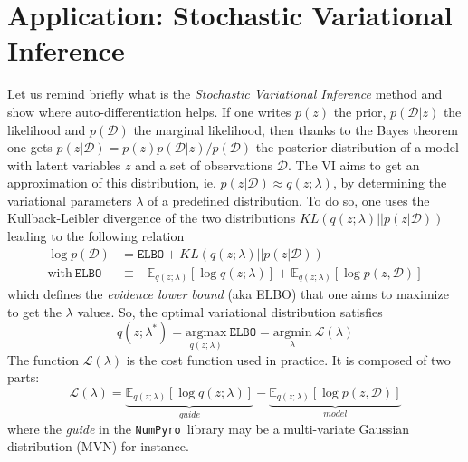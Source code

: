 \documentclass[twocolumn,twocolappendix,nofootinbib]{openjournal}
\newcommand{\numpyro}{\texttt{NumPyro}}
\begin{document}
\section{Application: Stochastic Variational Inference}
\label{sec-SVI}
%
Let us remind briefly what is the \textit{Stochastic Variational Inference} method \citep{2012arXiv1206.7051H, 2017arXiv171105597Z} and show where auto-differentiation helps. If one  writes $p(z)$ the prior, $p(\mathcal{D}|z)$ the likelihood and $p(\mathcal{D})$ the marginal likelihood, then thanks to the  Bayes theorem one gets $p(z|\mathcal{D})=p(z)p(\mathcal{D}|z)/p(\mathcal{D})$ the posterior distribution of a model with latent variables $z$ and a set of observations $\mathcal{D}$. The VI aims to get an approximation of this distribution, ie. $p(z|\mathcal{D}) \approx q(z;\lambda)$, by determining the variational parameters $\lambda$ of a predefined distribution. To do so, one uses the Kullback-Leibler divergence of the two distributions $KL(q(z;\lambda)||p(z|\mathcal{D}))$ leading to the following relation
\begin{align}
\log p(\mathcal{D}) &= \mathtt{ELBO} +  KL(q(z;\lambda)||p(z|\mathcal{D})) \label{eq-ELBO} \\
\mathrm{with} \ \mathtt{ELBO} &\equiv -\mathbb{E}_{q(z;\lambda)}\left[ \log q(z;\lambda)\right] + \mathbb{E}_{q(z;\lambda)}\left[ \log p(z,\mathcal{D}) \right] 
\end{align}
which defines the \textit{evidence lower bound} (aka ELBO) that one aims to maximize to get the $\lambda$ values. So, the optimal variational distribution satisfies
\begin{equation}
q(z;\lambda^\ast) = \underset{q(z;\lambda)}{\mathrm{argmax}}\  \mathtt{ELBO} = 
\underset{\lambda}{\mathrm{argmin}}\ \mathcal{L}(\lambda)
\end{equation}
The function $\mathcal{L}(\lambda)$ is the cost function used in practice. It is composed of two parts:
\begin{equation}
\mathcal{L}(\lambda) = \underbrace{\mathbb{E}_{q(z;\lambda)}\left[ \log q(z;\lambda)\right]}_{guide} - \underbrace{\mathbb{E}_{q(z;\lambda)}\left[ \log p(z,\mathcal{D}) \right]}_{model}
\label{eq-loss-svi-1}
\end{equation}
where the \textit{guide} in the \numpyro\ library may be a multi-variate Gaussian distribution (MVN) for instance.
\end{document}
